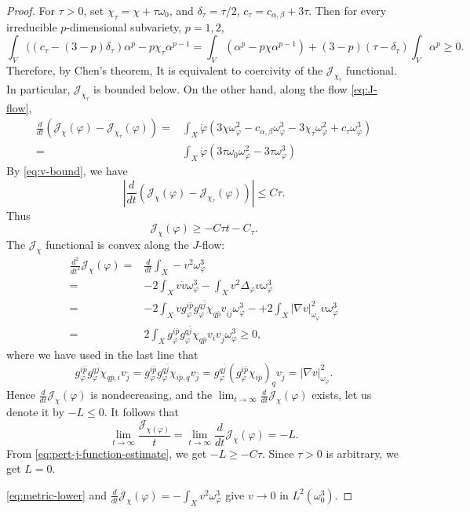 \documentclass[reqno]{amsart}
\theoremstyle{remark}
\newcommand{\cab}{c_{\alpha,\beta}}
\def\cJ{{\mathcal J}}
\theoremstyle{plain}
\begin{document}
\begin{proof}
For $\tau>0$, set $\chi_\tau=\chi+\tau\omega_0$, and $\delta_\tau=\tau/2$, $c_\tau=\cab+3\tau$. Then for every irreducible $p$-dimensional subvariety, $p=1,2$, \[
\int_V((c_\tau-(3-p)\delta_\tau)\alpha^p-p\chi_\tau\alpha^{p-1}=\int_V(\alpha^p-p\chi\alpha^{p-1})+(3-p)(\tau-\delta_\tau)\int_V\alpha^p\ge0.
\]
Therefore, by Chen's theorem\cite[Theorem 1.1]{C21}, It is  equivalent to coercivity of the $\cJ_{\chi_\tau}$ functional. In particular, $\cJ_{\chi_\tau}$ is bounded below. On the other hand, along the flow \eqref{eq:J-flow}, 
 \begin{equation}
 \begin{aligned}
     \frac{d}{dt}\left(\cJ_\chi(\varphi)-\cJ_{\chi_\tau}(\varphi)\right)=&\int_X\dot\varphi(3\chi\omega_\varphi^2-\cab\omega_\varphi^3-3\chi_\tau\omega_\varphi^2+c_\tau\omega_\varphi^3)\\
     =&\int_X \dot\varphi(3\tau\omega_0\omega_\varphi^2-3\tau\omega_\varphi^3)
 \end{aligned}
\end{equation}
By \eqref{eq:v-bound}, we have \[
 \left|\frac{d}{dt}\left(\cJ_\chi(\varphi)-\cJ_{\chi_\tau}(\varphi)\right)\right|\le C\tau.
\]
Thus \begin{equation}
    \label{eq:pert-j-function-estimate}\cJ_{\chi}(\varphi)\geq-C\tau t-C_\tau.
\end{equation}
The $\cJ_\chi$ functional is convex along the $J$-flow: \[\begin{aligned}
  \frac{d^2}{dt^2}\cJ_{\chi}(\varphi)=&\frac{d}{dt}\int_X-v^2\omega_\varphi^3\\
  =&-2\int_Xv\dot v\omega_\varphi^3-\int_Xv^2\Delta_{\varphi}v\omega_\varphi^3\\
  =&-2\int_X vg_\varphi^{i\bar p}g_\varphi^{q\bar j}\chi_{q\bar p}v_{i\bar j}\omega_\varphi^3-+2\int_X|\nabla v|_{\omega_\varphi}^2v\omega_\varphi^3\\
=&2\int_Xg_\varphi^{i\bar p}g_\varphi^{q\bar j}\chi_{q\bar p} v_iv_{\bar j}\omega_\varphi^3\geq 0,
\end{aligned}\]
where we have used in the last line that \[
g_\varphi^{i\bar p}g_\varphi^{q\bar j}\chi_{q\bar p,i}v_{\bar j}=g_\varphi^{i\bar p}g_\varphi^{q\bar j}\chi_{i\bar p,q}v_{\bar j}=g_\varphi^{q\bar j}(g_{\varphi}^{i\bar p}\chi_{i\bar p})_{q}v_{\bar j}=|\nabla v|_{\omega_\varphi}^2.
\]
Hence $\frac{d}{dt}\cJ_\chi(\varphi)$ is nondecreasing, and the $\lim_{t\to \infty}\frac{d}{dt}\cJ_\chi(\varphi)$ exists, let us denote it by $-L\leq 0$.
It follows that \[
\lim_{t\to \infty}\frac{\cJ_{\chi(\varphi)}}{t}=\lim_{t\to \infty}\frac{d}{dt}\cJ_\chi(\varphi)=-L.
\]
From \eqref{eq:pert-j-function-estimate}, we get $-L\geq -C\tau.$ Since $\tau>0$ is arbitrary, we get $L=0$. 

\eqref{eq:metric-lower} and $\frac{d}{dt}\cJ_{\chi}(\varphi)=-\int_{X}v^2\omega_\varphi^3$ give $v\to 0$ in $L^2(\omega_0^3)$.
\end{proof}
\end{document}
